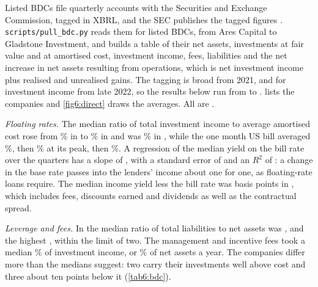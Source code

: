 \begin{chapterrefs}
Listed BDCs file quarterly accounts with the Securities and Exchange Commission, tagged in XBRL, and the
SEC publishes the tagged figures \parencite{secxbrl}. \texttt{scripts/pull\_bdc.py} reads them for
\dlFirms{} listed BDCs, from Ares Capital to Gladstone Investment, and builds a table of their net
assets, investments at fair value and at amortised cost, investment income, fees, liabilities and the
net increase in net assets resulting from operations, which is net investment income plus realised and
unrealised gains. The tagging is broad from 2021, and for investment income from late 2022, so the
results below run from \dlFirst{} to \dlLast{}.  lists the companies and
\cref{fig6:direct} draws the averages. All are .

\begin{table}[t]
  \centering
  \small
  \caption{ Nineteen listed business development companies in \dlLast, from their XBRL
  filings with the SEC: net assets, total liabilities over net assets, investments at fair value as a
  percentage of amortised cost, the median share of total investment income paid in management and
  incentive fees (a dash where the fees are not tagged), and the average annualised quarterly return on
  net assets from \dlFirst. Ordered by net assets.}
  \label{tab6:bdc}
  
\end{table}

\emph{Floating rates.} The median ratio of total investment income to average amortised cost rose from
\dlYieldFirst\% in \dlYieldFirstQ{} to \dlYieldPeak\% in \dlYieldPeakQ{} and was \dlYieldLast\% in \dlLast,
while the one month US bill averaged \dlBillFirst\%, then \dlBillPeak\% at its peak, then \dlBillLast\%. A
regression of the median yield on the bill rate over the \dlYieldN{} quarters has a slope of \dlPass{},
with a standard error of \dlPassSe{} and an $R^2$ of \dlPassRsq: a change in the base rate passes into
the lenders' income about one for one, as floating-rate loans require. The median income yield less the
bill rate was \dlSpreadLastBp{} basis points in \dlLast, which includes fees, discounts earned and
dividends as well as the contractual spread.

\emph{Leverage and fees.} In \dlLast{} the median ratio of total liabilities to net assets was
\dlLevMed, and the highest \dlLevMax, within the limit of two. The management and incentive fees took a
median \dlFeeShare\% of investment income, or \dlFeeNa\% of net assets a year. The companies differ more
than the medians suggest: two carry their investments well above cost and three about ten points below
it (\cref{tab6:bdc}).


\end{chapterrefs}
